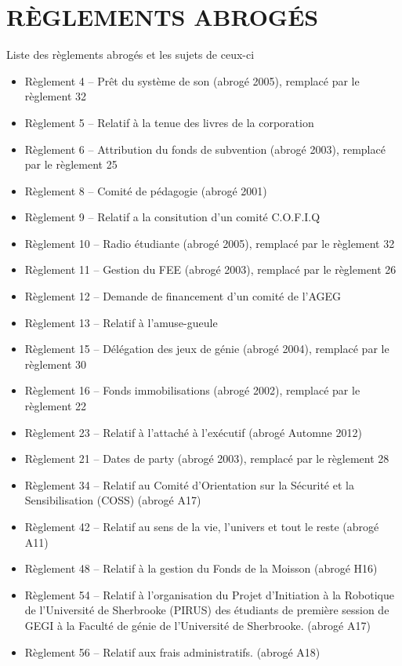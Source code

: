 \chapter*{RÈGLEMENTS ABROGÉS}
Liste des règlements abrogés et les sujets de ceux-ci

\begin{itemize}
\item[]{Règlement 4 – Prêt du système de son (abrogé 2005), remplacé par le règlement 32}
\item[]{Règlement 5 – Relatif à la tenue des livres de la corporation}
\item[]{Règlement 6 – Attribution du fonds de subvention (abrogé 2003), remplacé par le règlement 25}
\item[]{Règlement 8 – Comité de pédagogie (abrogé 2001)}
\item[]{Règlement 9 – Relatif a la consitution d'un comité C.O.F.I.Q}
\item[]{Règlement 10 – Radio étudiante (abrogé 2005), remplacé par le règlement 32}
\item[]{Règlement 11 – Gestion du FEE (abrogé 2003), remplacé par le règlement 26}
\item[]{Règlement 12 – Demande de financement d'un comité de l'AGEG}
\item[]{Règlement 13 – Relatif à l'amuse-gueule}
\item[]{Règlement 15 – Délégation des jeux de génie (abrogé 2004), remplacé par le règlement 30}
\item[]{Règlement 16 – Fonds immobilisations (abrogé 2002), remplacé par le règlement 22}
\item[]{Règlement 23 – Relatif à l’attaché à l’exécutif (abrogé Automne 2012)}
\item[]{Règlement 21 – Dates de party (abrogé 2003), remplacé par le règlement 28}
\item[]{Règlement 34 – Relatif au Comité d’Orientation sur la Sécurité et la Sensibilisation (COSS) (abrogé A17)}
\item[]{Règlement 42 – Relatif au sens de la vie, l’univers et tout le reste (abrogé A11)}
\item[]{Règlement 48 – Relatif à la gestion du Fonds de la Moisson (abrogé H16)}
\item[]{Règlement 54 – Relatif à l’organisation du Projet d’Initiation à la Robotique de l’Université de Sherbrooke (PIRUS) des étudiants de première session de GEGI à la Faculté de génie de l’Université de Sherbrooke. (abrogé A17)}
\item[]{Règlement 56 – Relatif aux frais administratifs. (abrogé A18)}
\end{itemize}
